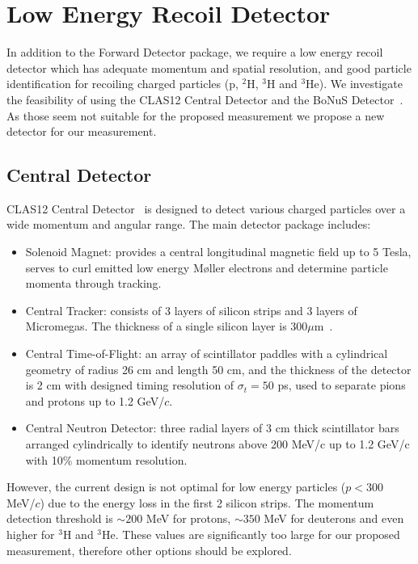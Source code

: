 \section{Low Energy Recoil Detector}


In addition to the Forward Detector package, we require a low energy recoil 
detector which has adequate momentum and spatial resolution, and good particle 
identification for recoiling charged particles (p, $^2$H, $^3$H and $^3$He). We 
investigate the feasibility of using the CLAS12 Central Detector and the BoNuS 
Detector~\cite{bonus6,bonus12}. As those seem not suitable for the proposed 
measurement we propose a new detector for our measurement.

\subsection{Central Detector}


CLAS12 Central Detector~\cite{CD} is designed to detect various charged 
particles over a wide momentum and angular range. The main detector package 
includes:
\begin{itemize}
 \item Solenoid Magnet: provides a central longitudinal magnetic field up to 5 
    Tesla, serves to curl emitted low energy M{\o}ller electrons and determine 
    particle momenta through tracking.
 \item Central Tracker: consists of 3 layers of silicon strips and 3 layers of 
    Micromegas. The thickness of a single silicon layer is 
    $300\mu$m~\cite{SVT}.
 \item Central Time-of-Flight: an array of scintillator paddles with a 
    cylindrical geometry of radius 26 cm and length 50 cm, and the thickness of 
    the detector is 2 cm with designed timing resolution of $\sigma_t = 50$ ps, 
    used to separate pions and protons up to 1.2 GeV/$c$.
 \item Central Neutron Detector:  three radial layers of 3 cm thick 
    scintillator bars arranged cylindrically to identify neutrons above 200 
    MeV/c up to 1.2 GeV/c with 10\% momentum resolution.
\end{itemize}


However, the current design is not optimal for low energy particles ($p<300$ 
MeV/$c$) due to the energy loss in the first 2 silicon strips. The momentum 
detection threshold is $\sim 200$ MeV for protons, $\sim 350$ MeV for deuterons 
and even higher for $^3$H and $^3$He. These values are significantly too large 
for our proposed measurement, therefore other options should be explored.

